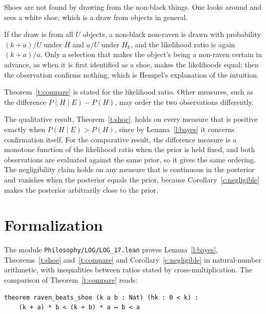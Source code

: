 \documentclass{situationist-preprint}
\begin{document}
\begin{objection}
Shoes are not found by drawing from the non-black things. One looks around and sees a white shoe, which is a draw from objects in general.
\end{objection}

\begin{reply}
If the draw is from all $U$ objects, a non-black non-raven is drawn with probability $(k+a)/U$ under $H$ and $a/U$ under $H_k$, and the likelihood ratio is again $(k+a)/a$. Only a selection that makes the object's being a non-raven certain in advance, as when it is first identified as a shoe, makes the likelihoods equal; then the observation confirms nothing, which is Hempel's explanation of the intuition.
\end{reply}

\begin{objection}\label{o:measure}
Theorem~\ref{t:compare} is stated for the likelihood ratio. Other measures, such as the difference $P(H \mid E) - P(H)$, may order the two observations differently.
\end{objection}

\begin{reply}
The qualitative result, Theorem~\ref{t:shoe}, holds on every measure that is positive exactly when $P(H \mid E) > P(H)$, since by Lemma~\ref{l:bayes} it concerns confirmation itself. For the comparative result, the difference measure is a monotone function of the likelihood ratio when the prior is held fixed, and both observations are evaluated against the same prior, so it gives the same ordering. The negligibility claim holds on any measure that is continuous in the posterior and vanishes when the posterior equals the prior, because Corollary~\ref{c:negligible} makes the posterior arbitrarily close to the prior.
\end{reply}


\section{Formalization}

The module \nolinkurl{Philosophy/LOG/LOG_17.lean} proves Lemma~\ref{l:bayes}, Theorems~\ref{t:shoe} and~\ref{t:compare} and Corollary~\ref{c:negligible} in natural-number arithmetic, with inequalities between ratios stated by cross-multiplication. The comparison of Theorem~\ref{t:compare} reads:

\begin{lstlisting}
theorem raven_beats_shoe (k a b : Nat) (hk : 0 < k) :
    (k + a) * b < (k + b) * a ↔ b < a
\end{lstlisting}
\end{document}
